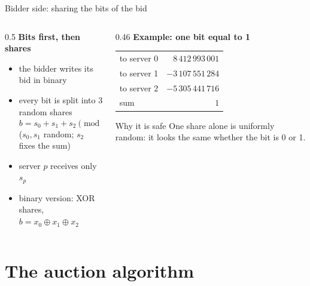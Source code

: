 \documentclass[aspectratio=169,11pt]{beamer}
\begin{document}
\begin{frame}{Bidder side: sharing the bits of the bid}
  \begin{columns}[T]
    \begin{column}{0.5\textwidth}
      \textbf{Bits first, then shares}
      \begin{itemize}
        \item the bidder writes its bid in binary
        \item every bit is split into 3 random shares
              \[ b = s_0 + s_1 + s_2 \pmod{2^{64}} \]
              ($s_0, s_1$ random; $s_2$ fixes the sum)
        \item server $p$ receives only $s_p$
        \item binary version: XOR shares, $b = x_0 \oplus x_1 \oplus x_2$
      \end{itemize}
    \end{column}
    \begin{column}{0.46\textwidth}
      \textbf{Example: one bit equal to 1}
      \begin{center}
        \small
        \begin{tabular}{@{}lr@{}}
          to server 0 & $8\,412\,993\,001$ \\
          to server 1 & $-3\,107\,551\,284$ \\
          to server 2 & $-5\,305\,441\,716$ \\
          \midrule
          sum & $1$
        \end{tabular}
      \end{center}
      \begin{exampleblock}{Why it is safe}
        One share alone is uniformly random: it looks the same whether the bit is 0 or 1.
      \end{exampleblock}
    \end{column}
  \end{columns}
\end{frame}

\section{The auction algorithm}
\end{document}
